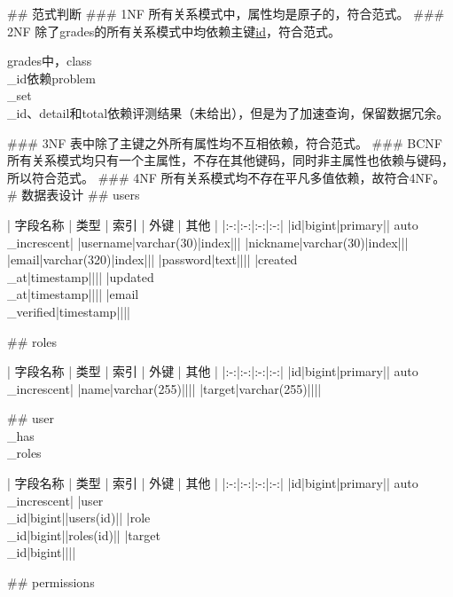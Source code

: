 \documentclass{ctexart}
\begin{document}
\begin{markdown}
## 范式判断
### 1NF
所有关系模式中，属性均是原子的，符合范式。
### 2NF
除了grades的所有关系模式中均依赖主键\underline{id}，符合范式。

grades中，class\\\_id依赖problem\\\_set\\\_id、detail和total依赖评测结果（未给出），但是为了加速查询，保留数据冗余。

### 3NF
表中除了主键之外所有属性均不互相依赖，符合范式。
### BCNF
所有关系模式均只有一个主属性，不存在其他键码，同时非主属性也依赖与键码，所以符合范式。
### 4NF
所有关系模式均不存在平凡多值依赖，故符合4NF。
# 数据表设计
## users

\begin{center}

| 字段名称 | 类型 | 索引 | 外键 | 其他 |
|:-:|:-:|:-:|:-:|
|id|bigint|primary|| auto\\\_increscent|
|username|varchar(30)|index|||
|nickname|varchar(30)|index|||
|email|varchar(320)|index|||
|password|text||||
|created\\\_at|timestamp||||
|updated\\\_at|timestamp||||
|email\\\_verified|timestamp||||

\end{center}
## roles

\begin{center}

| 字段名称 | 类型 | 索引 | 外键 | 其他 |
|:-:|:-:|:-:|:-:|
|id|bigint|primary|| auto\\\_increscent|
|name|varchar(255)||||
|target|varchar(255)||||

\end{center}
## user\\\_has\\\_roles

\begin{center}

| 字段名称 | 类型 | 索引 | 外键 | 其他 |
|:-:|:-:|:-:|:-:|
|id|bigint|primary|| auto\\\_increscent|
|user\\\_id|bigint||users(id)||
|role\\\_id|bigint||roles(id)||
|target\\\_id|bigint||||

\end{center}

## permissions

\begin{center}


\end{center}
\end{markdown}
\end{document}
